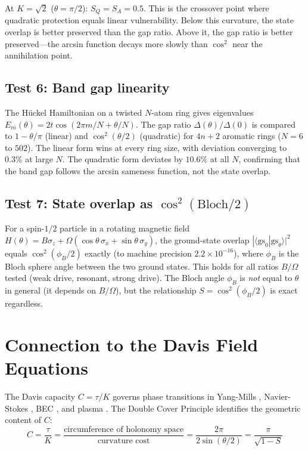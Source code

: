 \documentclass[11pt,letterpaper]{article}
\begin{document}
At $K = \sqrt{2}$ ($\theta = \pi/2$): $S_Q = S_A = 0.5$. This is the crossover point where quadratic protection equals linear vulnerability. Below this curvature, the state overlap is better preserved than the gap ratio. Above it, the gap ratio is better preserved---the arcsin function decays more slowly than $\cos^2$ near the annihilation point.

\subsection{Test 6: Band gap linearity}

The H\"uckel Hamiltonian on a twisted $N$-atom ring gives eigenvalues $E_m(\theta) = 2t\cos(2\pi m/N + \theta/N)$. The gap ratio $\Delta(\theta)/\Delta(0)$ is compared to $1 - \theta/\pi$ (linear) and $\cos^2(\theta/2)$ (quadratic) for $4n+2$ aromatic rings ($N = 6$ to $502$). The linear form wins at every ring size, with deviation converging to $0.3\%$ at large $N$. The quadratic form deviates by $10.6\%$ at all $N$, confirming that the band gap follows the arcsin sameness function, not the state overlap.

\subsection{Test 7: State overlap as $\cos^2(\text{Bloch}/2)$}

For a spin-$1/2$ particle in a rotating magnetic field $H(\theta) = B\sigma_z + \Omega(\cos\theta\,\sigma_x + \sin\theta\,\sigma_y)$, the ground-state overlap $|\langle\text{gs}_0|\text{gs}_\theta\rangle|^2$ equals $\cos^2(\phi_B/2)$ exactly (to machine precision $2.2 \times 10^{-16}$), where $\phi_B$ is the Bloch sphere angle between the two ground states. This holds for all ratios $B/\Omega$ tested (weak drive, resonant, strong drive). The Bloch angle $\phi_B$ is \emph{not} equal to $\theta$ in general (it depends on $B/\Omega$), but the relationship $S = \cos^2(\phi_B/2)$ is exact regardless.


\section{Connection to the Davis Field Equations}

The Davis capacity $C = \tau/K$ \cite{davis2025} governs phase transitions in Yang-Mills \cite{davis2025ym}, Navier-Stokes \cite{davis2026ns}, BEC \cite{davis2026bec}, and plasma \cite{davis2026plasma}. The Double Cover Principle identifies the geometric content of $C$:
\begin{equation}
C = \frac{\tau}{K} = \frac{\text{circumference of holonomy space}}{\text{curvature cost}} = \frac{2\pi}{2\sin(\theta/2)} = \frac{\pi}{\sqrt{1 - S}}
\end{equation}
\end{document}
